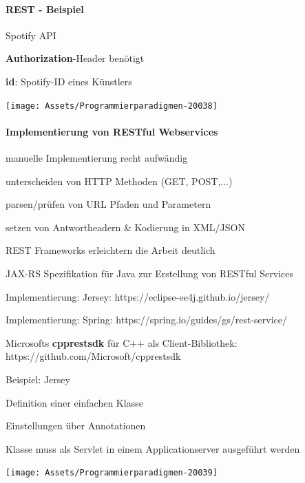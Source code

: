 \documentclass[10pt]{article}
\begin{document}
  \paragraph{REST - Beispiel}
  
  Spotify API
  \begin{itemize*}
    \item \textbf{Authorization}-Header benötigt
    \item \textbf{id}: Spotify-ID eines Künstlers
  \end{itemize*}
  \begin{center}
    \centering
    \texttt{[image: Assets/Programmierparadigmen-20038]}
  \end{center}
  
  \paragraph{Implementierung von RESTful Webservices}
  
  \begin{itemize*}
    \item manuelle Implementierung recht aufwändig
    \begin{itemize*}
      \item unterscheiden von HTTP Methoden (GET, POST,...)
      \item parsen/prüfen von URL Pfaden und Parametern
      \item setzen von Antwortheadern \& Kodierung in XML/JSON
    \end{itemize*}
    \item REST Frameworks erleichtern die Arbeit deutlich
    \begin{itemize*}
      \item JAX-RS Spezifikation für Java zur Erstellung von RESTful Services
      \begin{itemize*}
        \item Implementierung: Jersey: https://eclipse-ee4j.github.io/jersey/
        \item Implementierung: Spring:
        https://spring.io/guides/gs/rest-service/
      \end{itemize*}
      \item Microsofts \textbf{cpprestsdk} für C++ als Client-Bibliothek:
      https://github.com/Microsoft/cpprestsdk
    \end{itemize*}
  \end{itemize*}
  \begin{itemize*}
    \item Beispiel: Jersey
    \item Definition einer einfachen Klasse
    \begin{itemize*}
      \item Einstellungen über Annotationen
      \item Klasse muss als Servlet in einem Applicationserver ausgeführt werden
    \end{itemize*}
  \end{itemize*}
  \begin{center}
    \centering
    \texttt{[image: Assets/Programmierparadigmen-20039]}
  \end{center}
  
\end{document}
